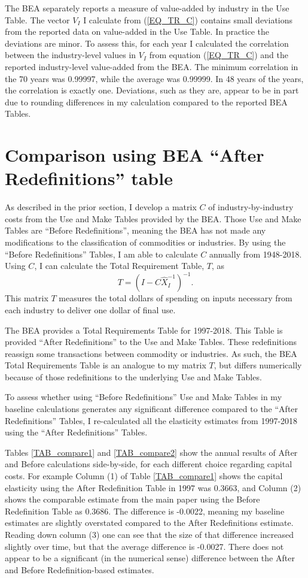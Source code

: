 \documentclass[11pt]{article}
\begin{document}
The BEA separately reports a measure of value-added by industry in the Use Table. The vector $V_I$ I calculate from (\ref{EQ_TR_C}) contains small deviations from the reported data on value-added in the Use Table. In practice the deviations are minor. To assess this, for each year I calculated the correlation between the industry-level values in $V_I$ from equation (\ref{EQ_TR_C}) and the reported industry-level value-added from the BEA. The minimum correlation in the 70 years was 0.99997, while the average was 0.99999. In 48 years of the years, the correlation is exactly one. Deviations, such as they are, appear to be in part due to rounding differences in my calculation compared to the reported BEA Tables. 

\section{Comparison using BEA ``After Redefinitions'' table}
As described in the prior section, I develop a matrix $C$ of industry-by-industry costs from the Use and Make Tables provided by the BEA. Those Use and Make Tables are ``Before Redefinitions'', meaning the BEA has not made any modifications to the classification of commodities or industries. By using the ``Before Redefinitions'' Tables, I am able to calculate $C$ annually from 1948-2018. Using $C$, I can calculate the Total Requirement Table, $T$, as
\begin{equation}
	T = \left(I - C \hat{X}_I^{-1}\right)^{-1}.
\end{equation}
This matrix $T$ measures the total dollars of spending on inputs necessary from each industry to deliver one dollar of final use. 

The BEA provides a Total Requirements Table for 1997-2018. This Table is provided ``After Redefinitions'' to the Use and Make Tables. These redefinitions reassign some transactions between commodity or industries. As such, the BEA Total Requirements Table is an analogue to my matrix $T$, but differs numerically because of those redefinitions to the underlying Use and Make Tables. 

To assess whether using ``Before Redefinitions'' Use and Make Tables in my baseline calculations generates any significant difference compared to the ``After Redefinitions'' Tables, I re-calculated all the elasticity estimates from 1997-2018 using the ``After Redefinitions'' Tables. 

Tables \ref{TAB_compare1} and \ref{TAB_compare2} show the annual results of After and Before calculations side-by-side, for each different choice regarding capital costs. For example Column (1) of Table \ref{TAB_compare1} shows the capital elasticity using the After Redefinition Table in 1997 was 0.3663, and Column (2) shows the comparable estimate from the main paper using the Before Redefinition Table as 0.3686. The difference is -0.0022, meaning my baseline estimates are slightly overstated compared to the After Redefinitions estimate. Reading down column (3) one can see that the size of that difference increased slightly over time, but that the average difference is -0.0027. There does not appear to be a significant (in the numerical sense) difference between the After and Before Redefinition-based estimates.
\end{document}
